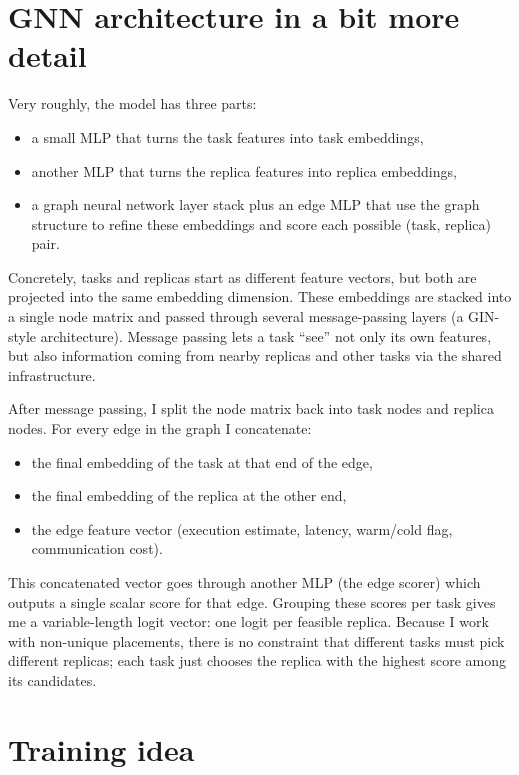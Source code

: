 \documentclass[11pt,a4paper]{article}
\begin{document}
\section*{GNN architecture in a bit more detail}

Very roughly, the model has three parts:
\begin{itemize}
  \item a small MLP that turns the task features into task embeddings,
  \item another MLP that turns the replica features into replica embeddings,
  \item a graph neural network layer stack plus an edge MLP that use the graph structure to refine these embeddings and score each possible (task, replica) pair.
\end{itemize}

Concretely, tasks and replicas start as different feature vectors, but both are projected into the same embedding dimension.
These embeddings are stacked into a single node matrix and passed through several message-passing layers (a GIN-style architecture).
Message passing lets a task ``see'' not only its own features, but also information coming from nearby replicas and other tasks via the shared infrastructure.

After message passing, I split the node matrix back into task nodes and replica nodes.
For every edge in the graph I concatenate:
\begin{itemize}
  \item the final embedding of the task at that end of the edge,
  \item the final embedding of the replica at the other end,
  \item the edge feature vector (execution estimate, latency, warm/cold flag, communication cost).
\end{itemize}
This concatenated vector goes through another MLP (the edge scorer) which outputs a single scalar score for that edge.
Grouping these scores per task gives me a variable-length logit vector: one logit per feasible replica.
Because I work with non-unique placements, there is no constraint that different tasks must pick different replicas; each task just chooses the replica with the highest score among its candidates.

\section*{Training idea}
\end{document}
